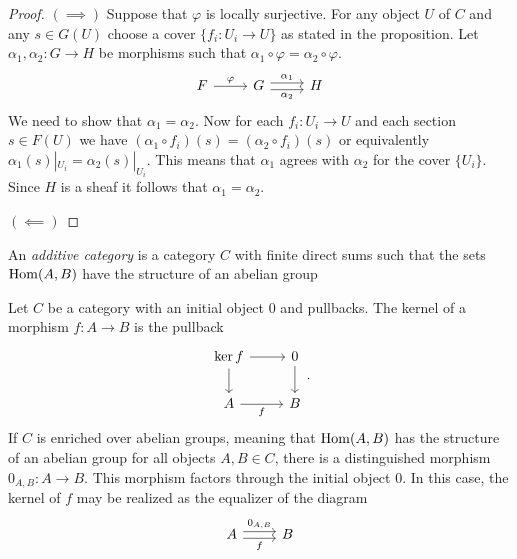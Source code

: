 \begin{proof}
	$(\implies)$ Suppose that $\varphi$ is locally surjective. For any object $U$ of $C$ and any $s \in G(U)$ choose a cover $\{f_i: U_i \to U\}$ as stated in the proposition. Let $\alpha_1, \alpha_2: G \to H$ be morphisms such that $\alpha_1 \circ \varphi = \alpha_2 \circ \varphi$. 
	\[
		\begin{tikzcd}
			F & G & H
			\arrow["\varphi", from=1-1, to=1-2]
			\arrow["{\alpha_2}"', shift right=1, from=1-2, to=1-3]
			\arrow["{\alpha_1}", shift left=1, from=1-2, to=1-3]
		\end{tikzcd}\]
	We need to show that $\alpha_1 = \alpha_2$.  Now for each $f_i: U_i \to U$ and each section $s \in F(U)$ we have $(\alpha_1 \circ f_i)(s) = (\alpha_2 \circ f_i)(s)$ or equivalently  $\alpha_1(s)|_{U_i} = \alpha_2(s)|_{U_i}$. This means that $\alpha_1$ agrees with $\alpha_2$ for the cover $\{U_i\}$. Since $H$ is a sheaf it follows that $\alpha_1 = \alpha_2$.\par
	$(\impliedby)$ 
\end{proof}

\begin{definition}
	An \textit{additive category} is a category $C$ with finite direct sums such that the sets $\operatorname{Hom}(A,B)$ have the structure of an abelian group 
\end{definition}

\begin{definition}[Kernels]
	Let $C$ be a category with an initial object $0$ and pullbacks. The kernel of a morphism $f: A \to B$ is the pullback
	\[
		\begin{tikzcd}
			{\ker f} & 0 \\
			A & B
			\arrow[from=1-1, to=2-1]
			\arrow[from=1-1, to=1-2]
			\arrow["f"', from=2-1, to=2-2]
			\arrow[from=1-2, to=2-2]
		\end{tikzcd}.
	\]
	If $C$ is enriched over abelian groups, meaning that $\operatorname{Hom}(A,B)$ has the structure of an abelian group for all objects $A,B \in C$, there is a distinguished morphism $0_{A,B} : A \to B$. This morphism factors through the initial object $0$. In this case, the kernel of $f$ may be realized as the equalizer of the diagram
	\[
		\begin{tikzcd}
			A & B
			\arrow["f"', shift right=1, from=1-1, to=1-2]
			\arrow["{0_{A,B}}", shift left=1, from=1-1, to=1-2]
		\end{tikzcd}		
	\]
\end{definition}

